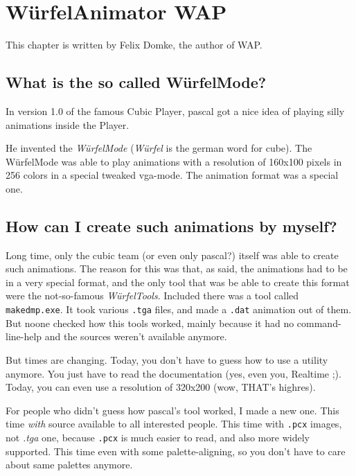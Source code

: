%
%

\chapter{W\"urfelAnimator WAP}
\label{wap}
This chapter is written by Felix Domke, the author of WAP.

\section{What is the so called W\"urfelMode?}
In version 1.0 of the famous Cubic Player, pascal got a nice idea of playing
silly animations inside the Player.

He invented the \emph{W\"urfelMode} (\emph{W\"urfel} is the german word for
cube). The W\"urfelMode was able to play animations with a resolution of
160x100 pixels in 256 colors in a special tweaked vga-mode. The animation
format was a special one.
 
\section{How can I create such animations by myself?}

Long time, only the cubic team (or even only pascal?) itself was able to
create such animations. The reason for this was that, as said, the animations
had to be in a very special format, and the only tool that was be able to
create this format were the not-so-famous \emph{W\"urfelTools}. Included
there was a tool called \texttt{makedmp.exe}. It  took  various \texttt{.tga}
files, and made a \texttt{.dat} animation out of them. But noone checked how
this tools worked, mainly because it had no command-line-help and the sources
weren't available anymore. 
 
But times are changing. Today, you don't have to guess how to use a utility 
anymore. You just have to read the documentation (yes, even you, Realtime ;).
Today, you can even use a resolution of 320x200 (wow, THAT's highres). 
 
For people who didn't guess how pascal's tool worked, I made a new one.
This time \emph{with} source available to all interested people. This time
with \texttt{.pcx} images, not \emph{.tga} one, because \texttt{.pcx} is much
easier to read, and also more widely supported. This time even with some
palette-aligning, so you don't have to care about same palettes anymore.
 
